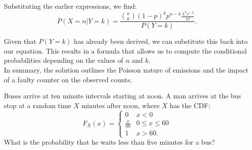 \begin{solution}
    Substituting the earlier expressions, we find:
    \[
    P(X = n | Y = k) = \frac{\binom{n}{k} (1 - p)^k p^{n - k} \frac{\lambda^n e^{-\lambda}}{n!}}{P(Y = k)}.
    \]
    
    Given that \(P(Y = k)\) has already been derived, we can substitute this back into our equation. This results in a formula that allows us to compute the conditional probabilities depending on the values of \(n\) and \(k\).\\
    
    In summary, the solution outlines the Poisson nature of emissions and the impact of a faulty counter on the observed counts. 
    \end{solution}
    


\begin{exercise}
Buses arrive at ten minute intervals starting at noon. A man arrives at the bus stop at a random time \(X\) minutes after noon, where \(X\) has the CDF:
\[
F_X(x) =
\begin{cases}
0 & x < 0 \\
\frac{x}{60} & 0 \leq x \leq 60 \\
1 & x > 60.
\end{cases}
\]
What is the probability that he waits less than five minutes for a bus?
\end{exercise}

